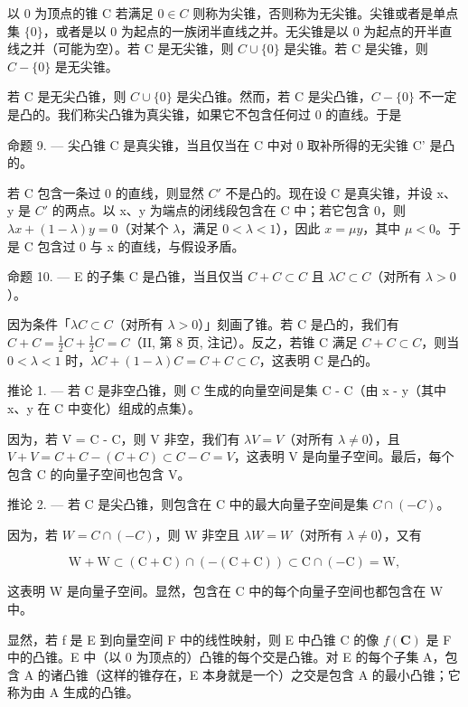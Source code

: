 以 0 为顶点的锥 C 若满足 \(0 \in C\) 则称为尖锥，否则称为无尖锥。尖锥或者是单点集 \(\{0\}\)，或者是以 0 为起点的一族闭半直线之并。无尖锥是以 0 为起点的开半直线之并（可能为空）。若 C 是无尖锥，则 \(C \cup \{0\}\) 是尖锥。若 C 是尖锥，则 \(C - \{0\}\) 是无尖锥。

若 C 是无尖凸锥，则 \(C \cup \{0\}\) 是尖凸锥。然而，若 C 是尖凸锥，\(C - \{0\}\) 不一定是凸的。我们称尖凸锥为真尖锥，如果它不包含任何过 0 的直线。于是

命题 9. --- 尖凸锥 C 是真尖锥，当且仅当在 C 中对 0 取补所得的无尖锥 C' 是凸的。

若 C 包含一条过 0 的直线，则显然 \(C'\) 不是凸的。现在设 C 是真尖锥，并设 x、y 是 \(C'\) 的两点。以 x、y 为端点的闭线段包含在 C 中；若它包含 0，则 \(\lambda x + (1 - \lambda)y = 0\)（对某个 \(\lambda\)，满足 \(0 < \lambda < 1\)），因此 \(x = \mu y\)，其中 \(\mu < 0\)。于是 C 包含过 0 与 x 的直线，与假设矛盾。

命题 10. --- E 的子集 C 是凸锥，当且仅当 \(C + C \subset C\) 且 \(\lambda C \subset C\)（对所有 \(\lambda > 0\)）。

因为条件「\(\lambda C \subset C\)（对所有 \(\lambda > 0\)）」刻画了锥。若 C 是凸的，我们有 \(C + C = \frac{1}{2}C + \frac{1}{2}C = C\)（II, 第 8 页, 注记）。反之，若锥 C 满足 \(C + C \subset C\)，则当 \(0 < \lambda < 1\) 时，\(\lambda C + (1 - \lambda)C = C + C \subset C\)，这表明 C 是凸的。

推论 1. --- 若 C 是非空凸锥，则 C 生成的向量空间是集 C - C（由 x - y（其中 x、y 在 C 中变化）组成的点集）。

因为，若 V = C - C，则 V 非空，我们有 \(\lambda V = V\)（对所有 \(\lambda \neq 0\)），且 \(V + V = C + C - (C + C) \subset C - C = V\)，这表明 V 是向量子空间。最后，每个包含 C 的向量子空间也包含 V。

推论 2. --- 若 C 是尖凸锥，则包含在 C 中的最大向量子空间是集 \(C \cap (-C)\)。

因为，若 \(W = C \cap (-C)\)，则 W 非空且 \(\lambda W = W\)（对所有 \(\lambda \neq 0\)），又有

\[
\mathrm{W} + \mathrm{W} \subset (\mathrm{C} + \mathrm{C}) \cap (- (\mathrm{C} + \mathrm{C})) \subset \mathrm{C} \cap (- \mathrm{C}) = \mathrm{W},
\]

这表明 W 是向量子空间。显然，包含在 C 中的每个向量子空间也都包含在 W 中。

显然，若 f 是 E 到向量空间 F 中的线性映射，则 E 中凸锥 C 的像 \(f(\mathbf{C})\) 是 F 中的凸锥。E 中（以 0 为顶点的）凸锥的每个交是凸锥。对 E 的每个子集 A，包含 A 的诸凸锥（这样的锥存在，E 本身就是一个）之交是包含 A 的最小凸锥；它称为由 A 生成的凸锥。

